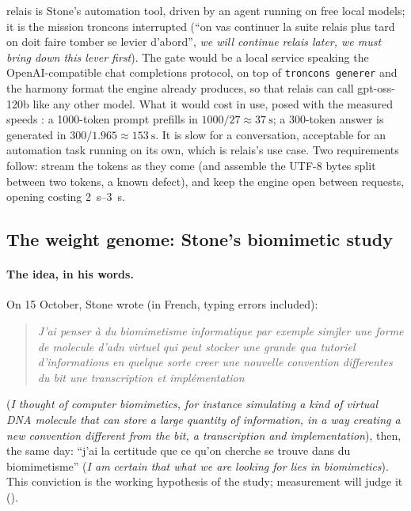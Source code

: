 relais is Stone's automation tool, driven by an agent running on free local models; it is the mission troncons interrupted (``on vas continuer la suite relais plus tard on doit faire tomber se levier d'abord'', \emph{we will continue relais later, we must bring down this lever first}). The gate would be a local service speaking the OpenAI-compatible chat completions protocol, on top of \texttt{troncons generer} and the harmony format the engine already produces, so that relais can call gpt-oss-120b like any other model. What it would cost in use, posed with the measured speeds \calc: a \num{1000}-token prompt prefills in $1000/27 \approx \SI{37}{\second}$; a 300-token answer is generated in $300/1.965 \approx \SI{153}{\second}$. It is slow for a conversation, acceptable for an automation task running on its own, which is relais's use case. Two requirements follow: stream the tokens as they come (and assemble the UTF-8 bytes split between two tokens, a known defect), and keep the engine open between requests, opening costing \SIrange{2}{3}{\second}.

\subsection{The weight genome: Stone's biomimetic study}\label{t2d-sec:genome}

\paragraph{The idea, in his words.} On 15 October, Stone wrote (in French, typing errors included):
\begin{quote}\itshape
J'ai penser à du biomimetisme informatique par exemple simjler une forme de molecule d'adn virtuel qui peut stocker une grande qua tutoriel d'informations en quelque sorte creer une nouvelle convention differentes du bit une transcription et implémentation
\end{quote}
(\emph{I thought of computer biomimetics, for instance simulating a kind of virtual DNA molecule that can store a large quantity of information, in a way creating a new convention different from the bit, a transcription and implementation}), then, the same day: ``j'ai la certitude que ce qu'on cherche se trouve dans du biomimetisme'' (\emph{I am certain that what we are looking for lies in biomimetics}). This conviction is the working hypothesis of the study; measurement will judge it ().

